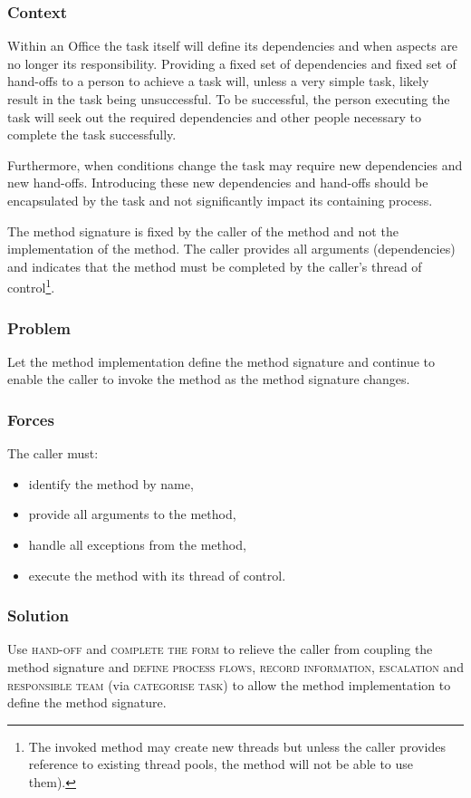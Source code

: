 \documentclass[prodmode]{style/acmlarge}
\begin{document}
\subsubsection*{Context} Within an Office the task itself will define its
dependencies and when aspects are no longer its responsibility.  Providing a
fixed set of dependencies and fixed set of hand-offs to a person to achieve a
task will, unless a very simple task, likely result in the task being
unsuccessful.  To be successful, the person executing the task will seek out the
required dependencies and other people necessary to complete the task
successfully.

Furthermore, when conditions change the task may require new dependencies and
new hand-offs.  Introducing these new dependencies and hand-offs should be
encapsulated by the task and not significantly impact its containing process.

The method signature is fixed by the caller of the method and not the
implementation of the method.  The caller provides all arguments (dependencies)
and indicates that the method must be completed by the caller's thread of
control\footnote{The invoked method may create new threads but unless the caller
provides reference to existing thread pools, the method will not be able to use
them).}.

\subsubsection*{Problem} Let the method implementation define the method
signature and continue to enable the caller to invoke the method as the method
signature changes.

\subsubsection*{Forces} The caller must:
\begin{itemize}
  \item identify the method by name,
  \item provide all arguments to the method,
  \item handle all exceptions from the method,
  \item execute the method with its thread of control.
\end{itemize}

\subsubsection*{Solution} Use \textsc{hand-off} and \textsc{complete the form}
to relieve the caller from coupling the method signature and \textsc{define
process flows}, \textsc{record information}, \textsc{escalation} and
\textsc{responsible team} (via \textsc{categorise task}) to allow the method
implementation to define the method signature.
\end{document}

